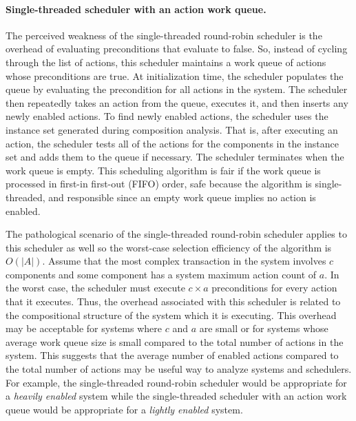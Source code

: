 \paragraph{Single-threaded scheduler with an action work queue.}
The perceived weakness of the single-threaded round-robin scheduler is the overhead of evaluating preconditions that evaluate to false.
So, instead of cycling through the list of actions, this scheduler maintains a work queue of actions whose preconditions are true.
At initialization time, the scheduler populates the queue by evaluating the precondition for all actions in the system.
The scheduler then repeatedly takes an action from the queue, executes it, and then inserts any newly enabled actions.
To find newly enabled actions, the scheduler uses the instance set generated during composition analysis.
That is, after executing an action, the scheduler tests all of the actions for the components in the instance set and adds them to the queue if necessary.
The scheduler terminates when the work queue is empty.
This scheduling algorithm is fair if the work queue is processed in first-in first-out (FIFO) order, safe because the algorithm is single-threaded, and responsible since an empty work queue implies no action is enabled.

The pathological scenario of the single-threaded round-robin scheduler applies to this scheduler as well so the worst-case selection efficiency of the algorithm is $O(|A|)$.
Assume that the most complex transaction in the system involves $c$ components and some component has a system maximum action count of $a$.
In the worst case, the scheduler must execute $c \times a$ preconditions for every action that it executes.
Thus, the overhead associated with this scheduler is related to the compositional structure of the system which it is executing.
This overhead may be acceptable for systems where $c$ and $a$ are small or for systems whose average work queue size is small compared to the total number of actions in the system.
This suggests that the average number of enabled actions compared to the total number of actions may be useful way to analyze systems and schedulers.
For example, the single-threaded round-robin scheduler would be appropriate for a \emph{heavily enabled} system while the single-threaded scheduler with an action work queue would be appropriate for a \emph{lightly enabled} system.

